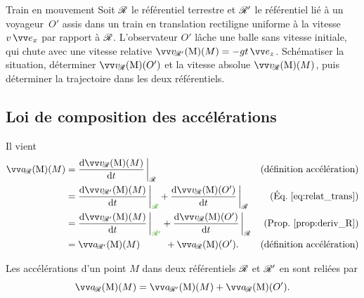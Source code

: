 \documentclass[12pt,fancy]{cours}
\begin{document}
\begin{exemple}{Train en mouvement}
Soit $\mathcal{R}$ le référentiel terrestre et $\mathcal{R}'$
le référentiel lié à un voyageur~$O'$ assis dans un train en translation rectiligne uniforme à la vitesse $v\,\ex$ par rapport à $\mathcal{R}$. L'observateur $O'$ lâche une balle sans vitesse initiale, qui chute avec une vitesse relative $\vRp(M)=-gt\,\ez$. Schématiser la situation, déterminer $\vR(O')$ et la vitesse absolue $\vR(M)$, puis déterminer la trajectoire dans les deux référentiels.
\end{exemple}

\subsection{Loi de composition des accélérations}

Il vient
\begin{align*}
\aR(M) & = \dR{\vR(M)}{t}{\Rcal} & (\text{définition accélération})\\
& = \dR{\vRp(M)}{t}{\JVert{\Rcal}}  + \dR{\vR(O')}{t}{\Rcal}   & (\text{\Eq{relat_trans}}) \\
& = \dR{\vRp(M)}{t}{\JVert{\Rcal'}} + \dR{\vR(O')}{t}{\Rcal}     & (\text{\Prop{deriv_R}}) \\
& =  \aRp(M) ~~~~~~~~+ \aR(O') .  & (\text{définition accélération})
\end{align*}

\begin{theorem}\label{form:compoa}
Les accélérations d'un point $M$ dans deux référentiels $\mathcal{R}$ et $\mathcal{R}'$ en  sont reliées par
\begin{equation*}
\aR(M) = \aRp(M) + \aR(O').
\end{equation*}
\end{theorem}
\end{document}
